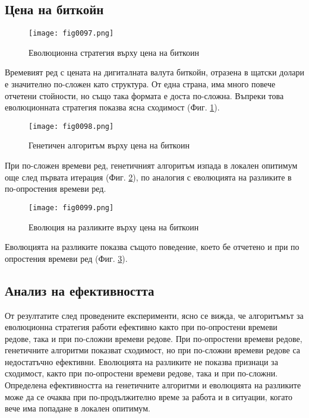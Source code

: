 \subsection{Цена на биткойн}

\begin{figure}[H]
  \centering
  \texttt{[image: fig0097.png]}
  \caption{Еволюционна стратегия върху цена на биткоин}
\label{fig0097}
\end{figure}

Времевият ред с цената на дигиталната валута биткойн, отразена в щатски долари е значително по-сложен като структура. От една страна, има много повече отчетени стойности, но също така формата е доста по-сложна. Въпреки това еволюционната стратегия показва ясна сходимост (Фиг. \ref{fig0097}).

\begin{figure}[H]
  \centering
  \texttt{[image: fig0098.png]}
  \caption{Генетичен алгоритъм върху цена на биткоин}
\label{fig0098}
\end{figure}

При по-сложен времеви ред, генетичният алгоритъм изпада в локален опитимум още след първата итерация (Фиг. \ref{fig0098}), по аналогия с еволюцията на разликите в по-опростения времеви ред.

\begin{figure}[H]
  \centering
  \texttt{[image: fig0099.png]}
  \caption{Еволюция на разликите върху цена на биткоин}
\label{fig0099}
\end{figure}

Еволюцията на разликите показва същото поведение, което бе отчетено и при по опростения времеви ред (Фиг. \ref{fig0099}).

\subsection{Анализ на ефективността}

От резултатите след проведените експерименти, ясно се вижда, че алгоритъмът за еволюционна стратегия работи ефективно както при по-опростени времеви редове, така и при по-сложни времеви редове. При по-опростени времеви редове, генетичните алгоритми показват сходимост, но при по-сложни времеви редове са недостатъчно ефективни. Еволюцията на разликите не показва признаци за сходимост, както при по-опростени времеви редове, така и при по-сложни. Определена ефективността на генетичните алгоритми и еволюцията на разликите може да се очаква при по-продължително време за работа и в ситуации, когато вече има попадане в локален опитимум. 

